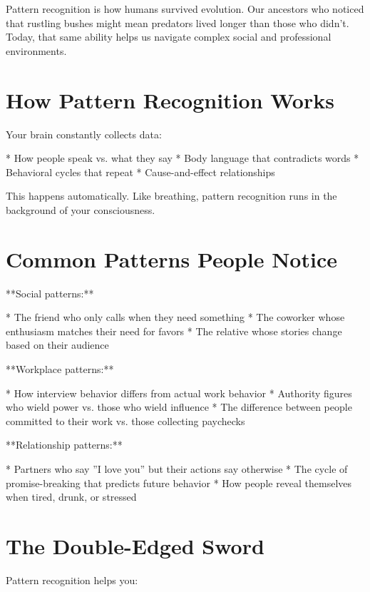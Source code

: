 \documentclass[12pt,oneside]{book}
\begin{document}
Pattern recognition is how humans survived evolution. Our ancestors who noticed that rustling bushes might mean predators lived longer than those who didn't. Today, that same ability helps us navigate complex social and professional environments.

\section{How Pattern Recognition Works}

Your brain constantly collects data:

                    * How people speak vs. what they say
                    * Body language that contradicts words
                    * Behavioral cycles that repeat
                    * Cause-and-effect relationships

This happens automatically. Like breathing, pattern recognition runs in the background of your consciousness.

\section{Common Patterns People Notice}

**Social patterns:**

                    * The friend who only calls when they need something
                    * The coworker whose enthusiasm matches their need for favors
                    * The relative whose stories change based on their audience

**Workplace patterns:**

                    * How interview behavior differs from actual work behavior
                    * Authority figures who wield power vs. those who wield influence
                    * The difference between people committed to their work vs. those collecting paychecks

**Relationship patterns:**

                    * Partners who say ''I love you'' but their actions say otherwise
                    * The cycle of promise-breaking that predicts future behavior
                    * How people reveal themselves when tired, drunk, or stressed

\section{The Double-Edged Sword}

Pattern recognition helps you:
\end{document}
